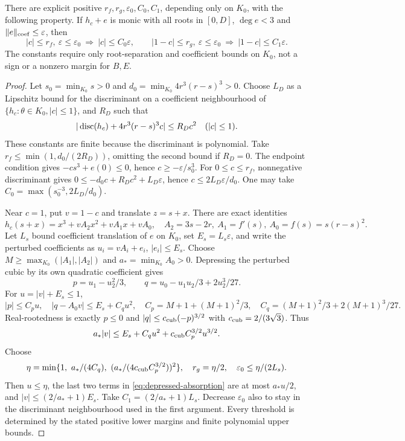 \begin{lemma}\label{lem:pencil-isolation}
There are explicit positive $r_f,r_g,\varepsilon_0,C_0,C_1$, depending
only on $K_0$, with the following property. If $h_c+e$ is monic with
all roots in $[0,D]$, $\deg e<3$ and $\|e\|_{\mathrm{coef}}\le\varepsilon$,
then
\[
 |c|\le r_f,\ \varepsilon\le\varepsilon_0
       \ \Longrightarrow\ |c|\le C_0\varepsilon,
 \qquad
 |1-c|\le r_g,\ \varepsilon\le\varepsilon_0
       \ \Longrightarrow\ |1-c|\le C_1\varepsilon.
\]
The constants require only root-separation and coefficient bounds on
$K_0$, not a sign or a nonzero margin for $B,E$.
\end{lemma}
\begin{proof}
Let $s_0=\min_{K_0}s>0$ and
$d_0=\min_{K_0}4r^3(r-s)^3>0$. Choose $L_D$ as a Lipschitz bound for
the discriminant on a coefficient neighbourhood of
$\{h_c:\theta\in K_0,|c|\le1\}$, and $R_D$ such that
\[
 |\operatorname{disc}(h_c)+4r^3(r-s)^3c|\le R_Dc^2\quad(|c|\le1).
\]
These constants are finite because the discriminant is polynomial.
Take $r_f\le\min(1,d_0/(2R_D))$, omitting the second bound if $R_D=0$.
The endpoint condition gives $-cs^3+e(0)\le0$, hence
$c\ge-\varepsilon/s_0^3$. For $0\le c\le r_f$, nonnegative
discriminant gives
$0\le-d_0c+R_Dc^2+L_D\varepsilon$, hence
$c\le2L_D\varepsilon/d_0$. One may take
$C_0=\max(s_0^{-3},2L_D/d_0)$.

Near $c=1$, put $v=1-c$ and translate $z=s+x$. There are exact identities
\[
 h_c(s+x)=x^3+vA_2x^2+vA_1x+vA_0,\quad
 A_2=3s-2r,\ A_1=f'(s),\ A_0=f(s)=s(r-s)^2.
\]
Let $L_s$ bound coefficient translation of $e$ on $K_0$, set
$E_s=L_s\varepsilon$, and write the perturbed coefficients as
$u_i=vA_i+e_i$, $|e_i|\le E_s$. Choose
$M\ge\max_{K_0}(|A_1|,|A_2|)$ and $a_*=\min_{K_0}A_0>0$.
Depressing the perturbed cubic by its own quadratic coefficient gives
\[
 p=u_1-u_2^2/3,\qquad q=u_0-u_1u_2/3+2u_2^3/27.
\]
For $u=|v|+E_s\le1$,
\[
 |p|\le C_pu,\quad |q-A_0v|\le E_s+C_qu^2,
 \quad C_p=M+1+(M+1)^2/3,\quad
 C_q=(M+1)^2/3+2(M+1)^3/27.
\]
Real-rootedness is exactly $p\le0$ and
$|q|\le c_{\rm cub}(-p)^{3/2}$ with $c_{\rm cub}=2/(3\sqrt3)$. Thus
\begin{equation}\label{eq:depressed-absorption}
 a_*|v|\le E_s+C_qu^2+c_{\rm cub}C_p^{3/2}u^{3/2}.
\end{equation}
Choose
\[
 \eta=\min\{1,\ a_*/(4C_q),\ (a_*/(4c_{\rm cub}C_p^{3/2}))^2\},
 \quad r_g=\eta/2,\quad \varepsilon_0\le\eta/(2L_s).
\]
Then $u\le\eta$, the last two terms in
\eqref{eq:depressed-absorption} are at most $a_*u/2$, and
$|v|\le(2/a_*+1)E_s$. Take $C_1=(2/a_*+1)L_s$.
Decrease $\varepsilon_0$ also to stay in the discriminant neighbourhood
used in the first argument. Every threshold is determined by the
stated positive lower margins and finite polynomial upper bounds.
\end{proof}

